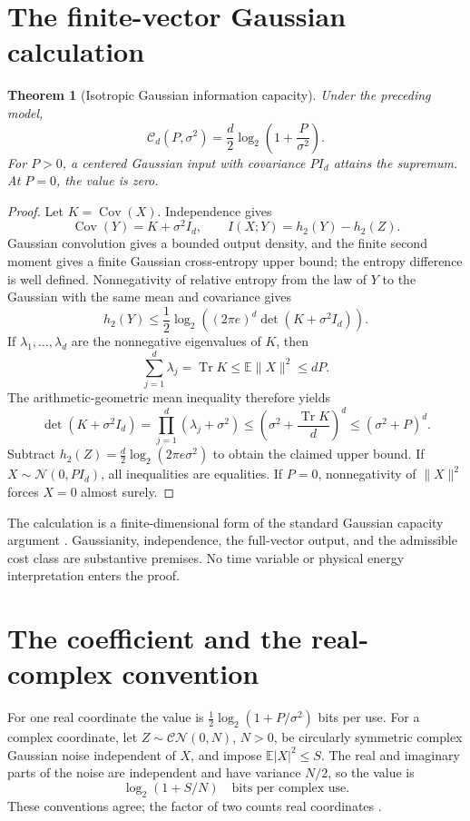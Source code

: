 \documentclass{article}
\newtheorem{theorem}{Theorem}
\begin{document}
\section{The finite-vector Gaussian calculation}
\begin{theorem}[Isotropic Gaussian information capacity]
Under the preceding model,
\[
\mathcal C_d(P,\sigma^2)
=\frac d2\log_2\!\left(1+\frac P{\sigma^2}\right).
\]
For \(P>0\), a centered Gaussian input with covariance \(PI_d\) attains the supremum. At \(P=0\), the value is zero.
\end{theorem}

\begin{proof}
Let \(K=\operatorname{Cov}(X)\). Independence gives
\[
\operatorname{Cov}(Y)=K+\sigma^2I_d,
\qquad I(X;Y)=h_2(Y)-h_2(Z).
\]
Gaussian convolution gives a bounded output density, and the finite second moment gives a finite Gaussian cross-entropy upper bound; the entropy difference is well defined. Nonnegativity of relative entropy from the law of \(Y\) to the Gaussian with the same mean and covariance gives
\[
h_2(Y)\le\frac12\log_2\!\left((2\pi e)^d\det(K+\sigma^2I_d)\right).
\]
If \(\lambda_1,\ldots,\lambda_d\) are the nonnegative eigenvalues of \(K\), then
\[
\sum_{j=1}^d\lambda_j=\operatorname{Tr}K
\le\mathbb E\|X\|^2\le dP.
\]
The arithmetic-geometric mean inequality therefore yields
\[
\det(K+\sigma^2I_d)
=\prod_{j=1}^d(\lambda_j+\sigma^2)
\le\left(\sigma^2+\frac{\operatorname{Tr}K}{d}\right)^d
\le(\sigma^2+P)^d.
\]
Subtract \(h_2(Z)=\frac d2\log_2(2\pi e\sigma^2)\) to obtain the claimed upper bound. If \(X\sim\mathcal N(0,PI_d)\), all inequalities are equalities. If \(P=0\), nonnegativity of \(\|X\|^2\) forces \(X=0\) almost surely.
\end{proof}

The calculation is a finite-dimensional form of the standard Gaussian capacity argument \cite{shannon,polyanskiy17}. Gaussianity, independence, the full-vector output, and the admissible cost class are substantive premises. No time variable or physical energy interpretation enters the proof.

\section{The coefficient and the real-complex convention}
For one real coordinate the value is \(\frac12\log_2(1+P/\sigma^2)\) bits per use. For a complex coordinate, let \(Z\sim\mathcal{CN}(0,N)\), \(N>0\), be circularly symmetric complex Gaussian noise independent of \(X\), and impose \(\mathbb E|X|^2\le S\). The real and imaginary parts of the noise are independent and have variance \(N/2\), so the value is
\[
\log_2(1+S/N)\quad\text{bits per complex use}.
\]
These conventions agree; the factor of two counts real coordinates \cite{polyanskiy17}.
\end{document}
